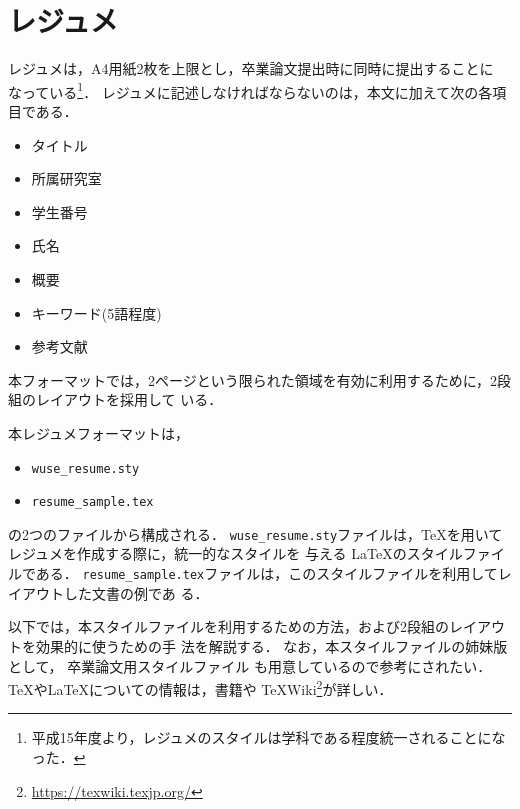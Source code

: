 \documentclass[twocolumn]{jarticle} %
\begin{document}
\maketitle
\thispagestyle{empty} %



\section{レジュメ}

レジュメは，A4用紙2枚を上限とし，卒業論文提出時に同時に提出することに
なっている\footnote{平成15年度より，レジュメのスタイルは学科である程度統一されることになった．}．
レジュメに記述しなければならないのは，本文に加えて次の各項目である．

\begin{itemize}
  \item タイトル
  \item 所属研究室
  \item 学生番号
  \item 氏名
  \item 概要
  \item キーワード(5語程度)
  \item 参考文献
\end{itemize}

本フォーマットでは，2ページという限られた領域を有効に利用するために，2段組のレイアウトを採用して
いる．

本レジュメフォーマットは，
\begin{itemize}
  \item {\tt wuse\_resume.sty}
  \item {\tt resume\_sample.tex}
\end{itemize}
の2つのファイルから構成される．
{\tt wuse\_resume.sty}ファイルは，\TeX を用いてレジュメを作成する際に，統一的なスタイルを
与える
\LaTeX のスタイルファイルである．
{\tt resume\_sample.tex}ファイルは，このスタイルファイルを利用してレイアウトした文書の例であ
る．

以下では，本スタイルファイルを利用するための方法，および2段組のレイアウトを効果的に使うための手
法を解説する．
なお，本スタイルファイルの姉妹版として，
卒業論文用スタイルファイル\cite{wusethesis}
も用意しているので参考にされたい．
\TeX や\LaTeX についての情報は，書籍\cite{latex_j,latexcomp,latex2e}や
\TeX Wiki\footnote{\url{https://texwiki.texjp.org/}}が詳しい．
\end{document}
